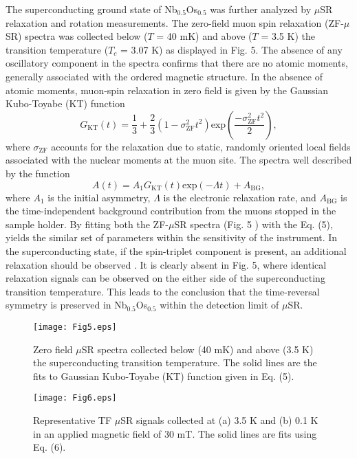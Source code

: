 \documentclass[reprint, superscriptaddress, secnumarabic, amssymb, nobibnotes, aps, prl]{revtex4-1}
\begin{document}
The superconducting ground state of Nb$_{0.5}$Os$_{0.5}$ was further analyzed by $\mu$SR relaxation and rotation measurements. The zero-field muon spin relaxation (ZF-$\mu$SR) spectra was collected below ($T$ = 40 mK) and above ($T$ = 3.5 K) the transition temperature ($T_{c}$ = 3.07 K) as displayed in Fig. 5. The absence of any oscillatory component in the spectra confirms that there are no atomic moments, generally associated with the ordered magnetic structure. In the absence of atomic moments, muon-spin relaxation in zero field is given by the Gaussian Kubo-Toyabe (KT) function \cite{RSH} 
\begin{equation}
G_{\mathrm{KT}}(t) = \frac{1}{3}+\frac{2}{3}(1-\sigma^{2}_{\mathrm{ZF}}t^{2})\mathrm{exp}\left(\frac{-\sigma^{2}_{\mathrm{ZF}}t^{2}}{2}\right) ,
\label{eqn4:zf}
\end{equation} 
where $\sigma_{\mathrm{ZF}}$ accounts for the relaxation due to static, randomly oriented local fields associated with the nuclear moments at the muon site.
The spectra well described by the function
\begin{equation}
A(t) = A_{1}G_{\mathrm{KT}}(t)\mathrm{exp}(-\Lambda t)+A_{\mathrm{BG}} ,
\label{eqn5:tay}
\end{equation} 
where $A_{1}$ is the initial asymmetry, $\Lambda$ is the electronic relaxation rate, and $A_{\mathrm{BG}}$ is the time-independent background contribution from the muons stopped in the sample holder. By fitting both the ZF-$\mu$SR spectra (Fig. 5 ) with the Eq. (5), yields the similar set of parameters within the sensitivity of the instrument. In the superconducting state, if the spin-triplet component is present, an additional relaxation should be observed \cite{lnc2,rz1,SPA,li1,sro1}. It is clearly absent in Fig. 5, where identical relaxation signals can be observed on the either side of the superconducting transition temperature. This leads to the conclusion that the time-reversal symmetry is preserved in Nb$_{0.5}$Os$_{0.5}$ within the detection limit of $\mu$SR.\\ 
\begin{figure}
\texttt{[image: Fig5.eps]}
\caption{\label{Fig5:ZFM} Zero field $\mu$SR spectra collected below (40 mK) and above (3.5 K) the superconducting transition temperature. The solid lines are the fits to Gaussian Kubo-Toyabe (KT) function given in Eq. (5). }
\end{figure}
\begin{figure}
\texttt{[image: Fig6.eps]}
\caption{\label{Fig6:TFM} Representative TF $\mu$SR signals collected at (a) 3.5 K and (b) 0.1 K in an applied magnetic field of 30 mT.
The solid lines are fits using Eq. (6).}
\end{figure} 
\end{document}
